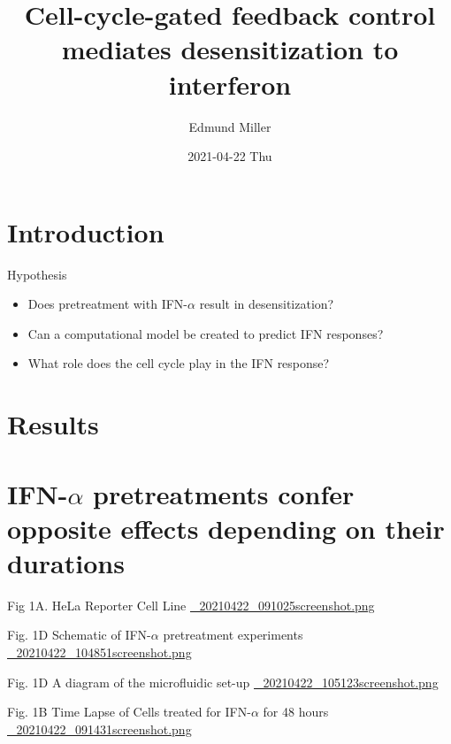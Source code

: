 \documentclass[bigger]{beamer}
\author{Edmund Miller}
\date{2021-04-22 Thu}
\title{Cell-cycle-gated feedback control mediates desensitization to interferon}
\begin{document}
\maketitle

\section{Introduction}
\label{sec:org390ef08}
\begin{frame}[label={sec:org06f496f}]{Hypothesis}
\begin{itemize}
\item Does pretreatment with IFN-\(\alpha\) result in desensitization?
\item Can a computational model be created to predict IFN responses?
\item What role does the cell cycle play in the IFN response?
\end{itemize}
\end{frame}

\section{Results}
\label{sec:org0e5db03}

\section{IFN-\(\alpha\) pretreatments confer opposite effects depending on their durations}
\label{sec:orgd9b6c5f}

\begin{frame}[label={sec:orgdba9e2d}]{Fig 1A. HeLa Reporter Cell Line}
\url{\_20210422\_091025screenshot.png}
\end{frame}

\begin{frame}[label={sec:org78d5f86}]{Fig. 1D Schematic of IFN-\(\alpha\) pretreatment experiments}
\url{\_20210422\_104851screenshot.png}
\end{frame}

\begin{frame}[label={sec:orga011b1e}]{Fig. 1D A diagram of the microfluidic set-up}
\url{\_20210422\_105123screenshot.png}
\end{frame}

\begin{frame}[label={sec:orge8088cb}]{Fig. 1B Time Lapse of Cells treated for IFN-\(\alpha\) for 48 hours}
\url{\_20210422\_091431screenshot.png}
\end{frame}
\end{document}
